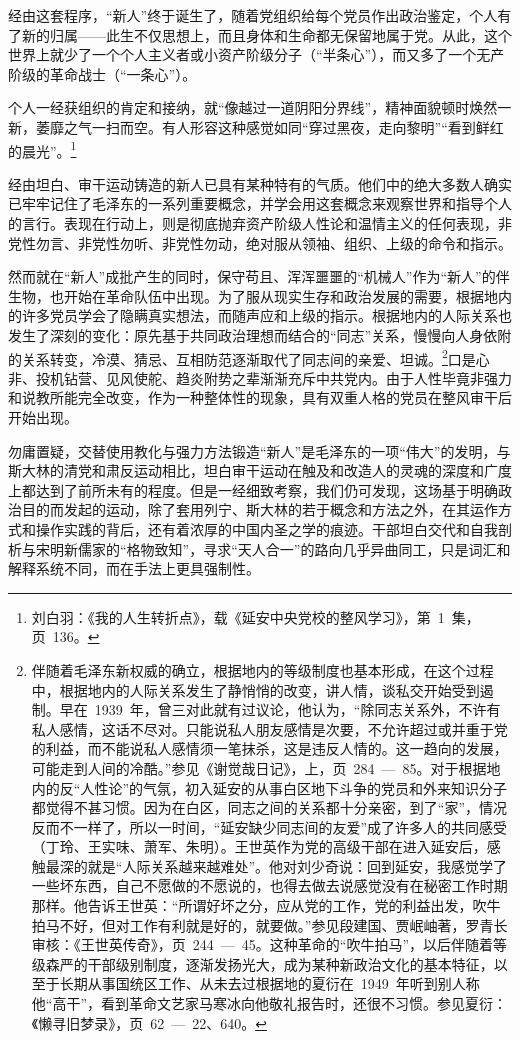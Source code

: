 经由这套程序，“新人”终于诞生了，随着党组织给每个党员作出政治鉴定，个人有了新的归属——此生不仅思想上，而且身体和生命都无保留地属于党。从此，这个世界上就少了一个个人主义者或小资产阶级分子（“半条心”），而又多了一个无产阶级的革命战士（“一条心”）。

个人一经获组织的肯定和接纳，就“像越过一道阴阳分界线”，精神面貌顿时焕然一新，萎靡之气一扫而空。有人形容这种感觉如同“穿过黑夜，走向黎明”“看到鲜红的晨光”。\footnote{刘白羽：《我的人生转折点》，载《延安中央党校的整风学习》，第~1~集，页~136。}

经由坦白、审干运动铸造的新人已具有某种特有的气质。他们中的绝大多数人确实已牢牢记住了毛泽东的一系列重要概念，并学会用这套概念来观察世界和指导个人的言行。表现在行动上，则是彻底抛弃资产阶级人性论和温情主义的任何表现，非党性勿言、非党性勿听、非党性勿动，绝对服从领袖、组织、上级的命令和指示。

然而就在“新人”成批产生的同时，保守苟且、浑浑噩噩的“机械人”作为“新人”的伴生物，也开始在革命队伍中出现。为了服从现实生存和政治发展的需要，根据地内的许多党员学会了隐瞒真实想法，而随声应和上级的指示。根据地内的人际关系也发生了深刻的变化：原先基于共同政治理想而结合的“同志”关系，慢慢向人身依附的关系转变，冷漠、猜忌、互相防范逐渐取代了同志间的亲爱、坦诚。\footnote{伴随着毛泽东新权威的确立，根据地内的等级制度也基本形成，在这个过程中，根据地内的人际关系发生了静悄悄的改变，讲人情，谈私交开始受到遏制。早在~1939~年，曾三对此就有过议论，他认为，“除同志关系外，不许有私人感情，这话不尽对。只能说私人朋友感情是次要，不允许超过或并重于党的利益，而不能说私人感情须一笔抹杀，这是违反人情的。这一趋向的发展，可能走到人间的冷酷。”参见《谢觉哉日记》，上，页~284~—~85。对于根据地内的反“人性论”的气氛，初入延安的从事白区地下斗争的党员和外来知识分子都觉得不甚习惯。因为在白区，同志之间的关系都十分亲密，到了“家”，情况反而不一样了，所以一时间，“延安缺少同志间的友爱”成了许多人的共同感受（丁玲、王实味、萧军、朱明）。王世英作为党的高级干部在进入延安后，感触最深的就是“人际关系越来越难处”。他对刘少奇说：回到延安，我感觉学了一些坏东西，自己不愿做的不愿说的，也得去做去说感觉没有在秘密工作时期那样。他告诉王世英：“所谓好坏之分，应从党的工作，党的利益出发，吹牛拍马不好，但对工作有利就是好的，就要做。”参见段建国、贾岷岫著，罗青长审核：《王世英传奇》，页~244~—~45。这种革命的“吹牛拍马”，以后伴随着等级森严的干部级别制度，逐渐发扬光大，成为某种新政治文化的基本特征，以至于长期从事国统区工作、从未去过根据地的夏衍在~1949~年听到别人称他“高干”，看到革命文艺家马寒冰向他敬礼报告时，还很不习惯。参见夏衍：《懒寻旧梦录》，页~62~—~22、640。}口是心非、投机钻营、见风使舵、趋炎附势之辈渐渐充斥中共党内。由于人性毕竟非强力和说教所能完全改变，作为一种整体性的现象，具有双重人格的党员在整风审干后开始出现。

勿庸置疑，交替使用教化与强力方法锻造“新人”是毛泽东的一项“伟大”的发明，与斯大林的清党和肃反运动相比，坦白审干运动在触及和改造人的灵魂的深度和广度上都达到了前所未有的程度。但是一经细致考察，我们仍可发现，这场基于明确政治目的而发起的运动，除了套用列宁、斯大林的若于概念和方法之外，在其运作方式和操作实践的背后，还有着浓厚的中国内圣之学的痕迹。干部坦白交代和自我剖析与宋明新儒家的“格物致知”，寻求“天人合一”的路向几乎异曲同工，只是词汇和解释系统不同，而在手法上更具强制性。